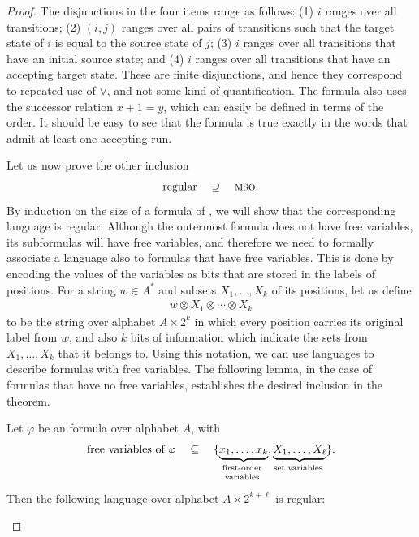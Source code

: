 \begin{proof}
The disjunctions in the four items range as follows: (1) $i$ ranges over all transitions; (2) $(i,j)$ ranges over all pairs of transitions   such that the target state of $i$ is equal to the source state of $j$; (3) $i$ ranges over all transitions that have an initial source state; and (4) $i$ ranges over all transitions that have an accepting target state. These are finite disjunctions, and hence they correspond to repeated use of $\lor$, and not some kind of quantification.  The formula also uses the successor relation $x+1 =y $, which can easily be defined in terms of the order. It should be easy to see that the formula is true exactly in the words that admit at least one accepting run.

Let us now prove the other inclusion     \begin{align*}    \text{regular} \quad \supseteq \quad \text{{\textsc{mso}}.}
    \end{align*}
    By induction on the size of a formula of \mso, we will show that the corresponding language is regular. Although the outermost formula does not have free variables, its subformulas will have free variables, and therefore we need to formally associate a language also to formulas that  have free variables. This is done by encoding the values of the variables as bits that are stored in the labels of positions. For a string $w \in A^*$ and subsets $X_1,\ldots,X_k$ of its positions, let us define 
    \begin{align*}
    w \otimes X_1 \otimes \cdots \otimes X_k 
    \end{align*}
    to be the string over alphabet $A \times 2^k$ in which every position carries its original label from $w$, and also $k$ bits of information which indicate the sets from $X_1,\ldots,X_k$ that it belongs to.  Using this notation, we can use languages to describe formulas with free variables. The following lemma, in the case of formulas that have no free variables, establishes the desired inclusion in the theorem. 
    \begin{lemma}\label{lem:mso-free-variables} Let $\varphi$ be an \mso formula over alphabet $A$, with
        \begin{align*}
            \text{free variables of $\varphi$} \quad \subseteq \quad 
        \set{\myunderbrace{x_1,\ldots,x_k}{first-order\\ variables}, 
        \myunderbrace{X_1,\ldots,X_\ell}{set  variables}}.
        \end{align*}
        Then the following language over alphabet $A \times 2^{k+\ell}$ is regular:

\end{lemma}
\end{proof}
